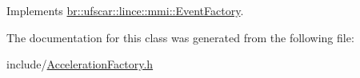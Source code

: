 Implements \hyperlink{classbr_1_1ufscar_1_1lince_1_1mmi_1_1EventFactory_a19ad2165726a29a55c921f569764290b}{br::ufscar::lince::mmi::EventFactory}.



The documentation for this class was generated from the following file:\begin{DoxyCompactItemize}
\item 
include/\hyperlink{AccelerationFactory_8h}{AccelerationFactory.h}\end{DoxyCompactItemize}
